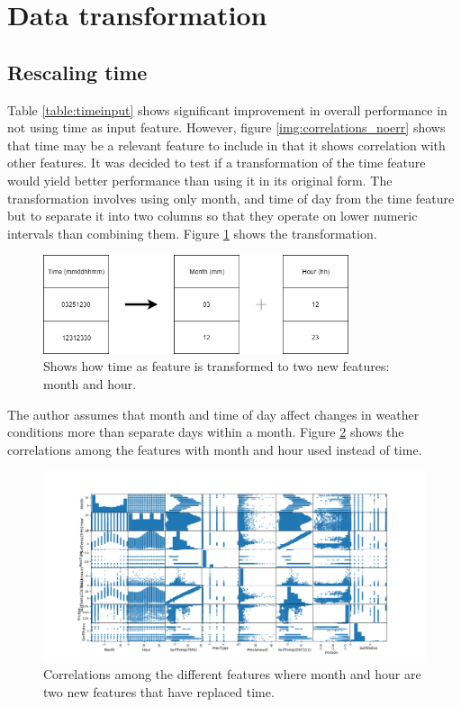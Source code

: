 \section{Data transformation} \label{sec:transformation}

	\subsection{Rescaling time}

	Table \ref{table:timeinput} shows significant improvement in overall performance in not using time as input feature. However, figure \ref{img:correlations_noerr} shows that time may be a relevant feature to include in that it shows correlation with other features. It was decided to test if a transformation of the time feature would yield better performance than using it in its original form. The transformation involves using only month, and time of day from the time feature but to separate it into two columns so that they operate on lower numeric intervals than combining them. Figure \ref{img:transformation} shows the transformation. 

\begin{figure}[H] 
	\centering
	\includegraphics[width=0.8\textwidth]{media/transformation_time.png}
	\caption{Shows how time as feature is transformed to two new features: month and hour.}
	\label{img:transformation}
\end{figure}

	The author assumes that month and time of day affect changes in weather conditions more than separate days within a month. Figure \ref{img:correlations_featureengi} shows the correlations among the features with month and hour used instead of time. 

\begin{figure}[H] 
	\centering
	\includegraphics[width=1\textwidth]{media/correlations_featureengi.png}
	\caption{Correlations among the different features where month and hour are two new features that have replaced time. }
	\label{img:correlations_featureengi}
\end{figure}

